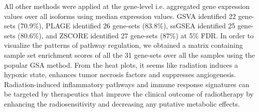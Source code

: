 \documentclass[hidelinks,11pt]{article}
\begin{document}
All other methods were applied at the gene-level i.e. aggregated gene expression values over all isoforms using median expression values. GSVA identified 22 gene-sets (70.9\%), PLAGE identified 26 gene-sets (83.8\%), ssGSEA identified 25 gene-sets (80.6\%), and ZSCORE identified 27 gene-sets (87\%) at 5\% FDR. In order to visualize the patterns of pathway regulation, we obtained a matrix containing sample set enrichment scores of all the 31 gene-sets over all the samples using the popular GSA method. From the heat plots, it seems like radiation induces a hypoxic state, enhances tumor necrosis factors and suppresses angiogenesis. Radiation-induced inflammatory pathways and immune response signatures can be targeted by therapeutics that improve the clinical outcome of radiotherapy by enhancing the radiosensitivity and decreasing any putative metabolic effects. 

\end{document}
